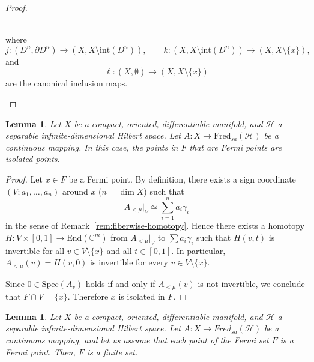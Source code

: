 \documentclass{amsart}
\newtheorem{lem}[thm]{Lemma}
\theoremstyle{definition}
\theoremstyle{remark}
\newcommand{\C}{\mathbb{C}}
\begin{document}
\begin{proof}
\begin{enumerate}
\\
where
\[
j\colon (D^n,\partial D^{n})\to (X, X \setminus \mathrm{int}(D^n)),
\qquad
k\colon (X, X \setminus \mathrm{int}(D^n))\to (X, X\setminus \{x\}),
\]
and
\[
\ell\colon (X,\emptyset)\to (X, X\setminus \{x\})
\]
are the canonical inclusion maps.
\end{enumerate}
\end{proof}

\begin{lem}\label{lem:4.14}
Let $X$ be a compact, oriented, differentiable manifold, and $\mathcal{H}$ a separable infinite-dimensional Hilbert space. Let $A \colon X \to \mathrm{Fred}_{sa}(\mathcal{H})$ be a continuous mapping. In this case, the points in $F$ that are Fermi points are isolated points.
\end{lem}

\begin{proof}
Let $x\in F$ be a Fermi point. By definition, there exists a sign coordinate $(V; a_1,\dots,a_n)$ around $x$
($n=\dim X$) such that
\[
A_{<\mu}\big|_{V} \simeq \sum_{i=1}^{n} a_i \gamma_i
\]
in the sense of Remark~\ref{rem:fiberwise-homotopy}. Hence there exists a homotopy
$H:V\times[0,1]\to \mathrm{End}(\C^{m})$ from $A_{<\mu}\big|_V$ to $\sum a_i\gamma_i$
such that $H(v,t)$ is invertible for all $v\in V\setminus\{x\}$ and all $t\in[0,1]$.
In particular, $A_{<\mu}(v)=H(v,0)$ is invertible for every $v\in V\setminus\{x\}$.

Since $0\in\mathrm{Spec}(A_v)$ holds if and only if $A_{<\mu}(v)$ is not invertible,
we conclude that $F\cap V=\{x\}$. Therefore $x$ is isolated in $F$.
\end{proof}

\begin{lem}\label{lem:4.15}
Let $X$ be a compact, oriented, differentiable manifold, and $\mathcal{H}$ a separable infinite-dimensional Hilbert space. Let $A \colon X\to Fred_{sa}(\mathcal{H}) $ be a continuous mapping, and let us assume that each point of the Fermi set \(F\) is a Fermi point. Then, \(F\) is a finite set.
\end{lem}
\end{document}
